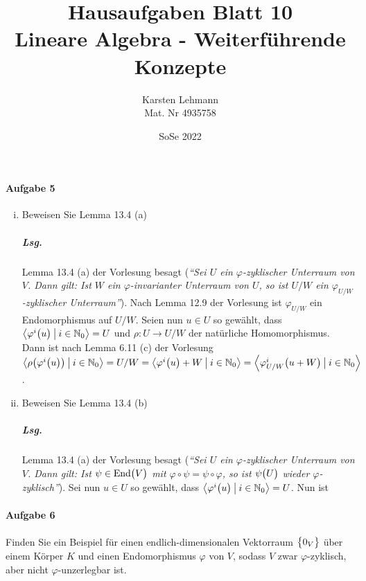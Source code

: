 \documentclass{scrreprt}
\author{Karsten Lehmann\\Mat. Nr 4935758}
\date{SoSe 2022}
\title{Hausaufgaben Blatt 10\\Lineare Algebra - Weiterführende Konzepte}
\newcommand{\End}{\text{End}}
\begin{document}
\paragraph{Aufgabe 5}
\begin{enumerate}[(i)]
\item Beweisen Sie Lemma 13.4 (a)

  \subparagraph{Lsg.} Lemma 13.4 (a) der Vorlesung besagt (\emph{``Sei $U$ ein
    $\varphi$-zyklischer Unterraum von $V$.
    Dann gilt: Ist $W$ ein $\varphi$-invarianter Unterraum von $U$, so ist $U/W$
    ein $\varphi_{U/W}$-zyklischer Unterraum''}).
  Nach Lemma 12.9 der Vorlesung ist $\varphi_{U/W}$ ein Endomorphismus auf $U / W$.
  Seien nun $u \in U$ so gewählt, dass $\left\langle
    \varphi^i\qty\big(u) \:\big|\: i \in \mathbb{N}_0
  \right\rangle = U$ und $\rho \colon U \to U / W$ der natürliche Homomorphismus.
  Dann ist nach Lemma 6.11 (c) der Vorlesung $\left\langle
    \rho\qty\big(\varphi^i\qty\big(u)) \:\big|\: i \in \mathbb{N}_0
  \right\rangle = U / W = \left\langle
    \varphi^i\qty\big(u) + W \:\big|\: i \in \mathbb{N}_0
  \right\rangle = \left\langle
    \varphi_{U / W}^i\qty\big(u + W) \:\big|\: i \in \mathbb{N}_0
  \right\rangle$.

\item Beweisen Sie Lemma 13.4 (b)

  \subparagraph{Lsg.}  Lemma 13.4 (a) der Vorlesung besagt (\emph{``Sei $U$ ein
    $\varphi$-zyklischer Unterraum von $V$.
    Dann gilt: Ist $\psi \in \End\qty\big(V)$ mit
    $\varphi \circ \psi = \psi \circ \varphi$, so ist $\psi\qty\big(U)$ wieder
    $\varphi$-zyklisch''}).
  Sei nun $u \in U$ so gewählt, dass $\left\langle
    \varphi^i\qty\big(u) \:\big|\: i \in \mathbb{N}_0
  \right\rangle = U$.
  Nun ist
\end{enumerate}

\paragraph{Aufgabe 6} Finden Sie ein Beispiel für einen endlich-dimensionalen
Vektorraum $\qty\big{0_V}$ über einem Körper $K$ und einen Endomorphismus
$\varphi$ von $V$, sodass $V$ zwar $\varphi$-zyklisch, aber nicht
$\varphi$-unzerlegbar ist.
\end{document}
